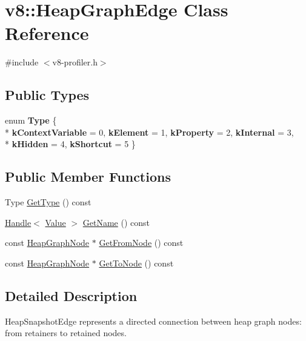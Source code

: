 \hypertarget{classv8_1_1_heap_graph_edge}{}\section{v8\+:\+:Heap\+Graph\+Edge Class Reference}
\label{classv8_1_1_heap_graph_edge}


{\ttfamily \#include $<$v8-\/profiler.\+h$>$}

\subsection*{Public Types}
\begin{DoxyCompactItemize}
\item 
\hypertarget{classv8_1_1_heap_graph_edge_a252500cf4307fe9e4fcb0335a907259b}{}enum {\bfseries Type} \{ \\*
{\bfseries k\+Context\+Variable} = 0, 
{\bfseries k\+Element} = 1, 
{\bfseries k\+Property} = 2, 
{\bfseries k\+Internal} = 3, 
\\*
{\bfseries k\+Hidden} = 4, 
{\bfseries k\+Shortcut} = 5
 \}\label{classv8_1_1_heap_graph_edge_a252500cf4307fe9e4fcb0335a907259b}

\end{DoxyCompactItemize}
\subsection*{Public Member Functions}
\begin{DoxyCompactItemize}
\item 
Type \hyperlink{classv8_1_1_heap_graph_edge_a7f4923098074ee4c47d901f363728d08}{Get\+Type} () const 
\item 
\hyperlink{classv8_1_1_handle}{Handle}$<$ \hyperlink{classv8_1_1_value}{Value} $>$ \hyperlink{classv8_1_1_heap_graph_edge_aa91362db6bfdbecfc48d3ba57d292705}{Get\+Name} () const 
\item 
const \hyperlink{classv8_1_1_heap_graph_node}{Heap\+Graph\+Node} $\ast$ \hyperlink{classv8_1_1_heap_graph_edge_acd43a5082f1862b7c0c0094fc75af631}{Get\+From\+Node} () const 
\item 
const \hyperlink{classv8_1_1_heap_graph_node}{Heap\+Graph\+Node} $\ast$ \hyperlink{classv8_1_1_heap_graph_edge_ad8fd8fa121a0e778a8b120a0c5fa227c}{Get\+To\+Node} () const 
\end{DoxyCompactItemize}


\subsection{Detailed Description}
Heap\+Snapshot\+Edge represents a directed connection between heap graph nodes\+: from retainers to retained nodes. 

